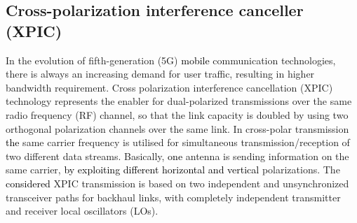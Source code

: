 { \subsection{Cross-polarization interference canceller (XPIC)} 
   In the evolution of fifth-generation (5G) \textcolor{black}{mobile} communication technologies, there is always an increasing demand for user traffic, resulting in higher bandwidth requirement.
Cross polarization interference cancellation (XPIC) technology
represents the enabler for dual-polarized transmissions over the
same radio frequency (RF) channel, so that the link capacity is
doubled by using two orthogonal polarization channels over the
same link. In cross-polar transmission \textcolor{black}{the} 
same carrier frequency is utilised for simultaneous
transmission/reception of two different data streams.
Basically, \textcolor{black}{one} antenna is sending information on the same carrier, \textcolor{black}{by exploiting different horizontal and vertical} polarizations. The \textcolor{black}{considered} XPIC transmission is based on two independent and unsynchronized transceiver paths for backhaul links, with completely independent transmitter and receiver local oscillators (LOs).   }
 
